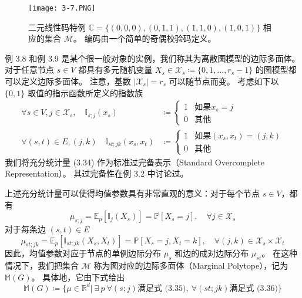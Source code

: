 \begin{figure}[htbp]
    \centering
    \texttt{[image: 3-7.PNG]}
    \caption{
        二元线性码特例 $\mathbb{C} = \{(0, 0, 0), (0, 1, 1), (1, 1, 0), (1, 0, 1)\}$ 相应的集合 $\mathcal{M}$。
        编码由一个简单的奇偶校验码定义。
    }\label{fig:3-7}
\end{figure}

例 3.8 和例 3.9 是某个很一般对象的实例，我们称其为离散图模型的边际多面体。
对于任意节点 $s \in V$ 都具有多元随机变量 $X_s \in \mathcal{X}_s \coloneqq \{0, 1, \dots, r_s-1\}$ 的图模型都可以定义边际多面体。
注意，基数 $|\mathcal{X}_s| = r_s$ 可以随节点而变。
考虑如下以 $\{0, 1\}$ 取值的指示函数所定义的指数族
\begin{align}
    \forall s \in V, j \in \mathcal{X}_s, \quad \mathbb{I}_{s;j}(x_s) &\coloneqq \begin{cases}
        1 & \text{如果} x_s = j \\
        0 & \text{其他}
    \end{cases} \nonumber \\
    \forall (s, t) \in E, (j, k) \quad \mathbb{I}_{st;jk}(x_s, x_t) &\coloneqq \begin{cases}
        1 & \text{如果} (x_s, x_t) = (j, k) \\
        0 & \text{其他}
    \end{cases}
\end{align}
我们将充分统计量 (3.34) 作为标准过完备表示（Standard Overcomplete Representation）。
其过完备性在例 3.2 中讨论过。

上述充分统计量可以使得均值参数具有非常直观的意义：对于每个节点 $s \in V$，都有
\begin{equation}
    \mu_{s;j} = \mathbb{E}_p[\mathbb{I}_j(X_s)] = \mathbb{P}[X_s = j], \quad \forall j \in \mathcal{X}_s
\end{equation}
对于每条边 $(s, t) \in E$
\begin{equation}
    \mu_{st;jk} = \mathbb{E}_p[\mathbb{I}_{st;jk}(X_s, X_t)] = \mathbb{P}[X_s = j, X_t = k], \quad \forall (j, k) \in \mathcal{X}_s \times \mathcal{X}_t
\end{equation}
因此，均值参数对应于节点的单例边际分布 $\mu_s$ 和边的成对边际分布 $\mu_{st}$。
在这种情况下，我们把集合 $\mathcal{M}$ 称为图对应的边际多面体（Marginal Polytope），记为 $\mathbb{M}(G)$。
具体地，它由下式给出
\begin{equation}
    \mathbb{M}(G) \coloneqq \{\mu \in \mathbb{R}^d| ~\exists ~p ~\forall (s; j) \text{满足式 (3.35)}, ~\forall (st; jk) \text{满足式 (3.36)}\}
\end{equation}

